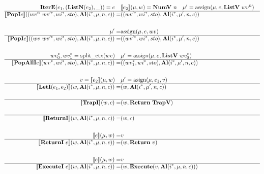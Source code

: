 \begin{align*}
%
\newline \\
  \itere(e_1, (\listniter(e_2), \_))=e \quad&
  \sem{e_2}(\mu, w) = \numv ~ n \quad
  \mu' = \text{assign}(\mu, e, \listv ~ wv^n) \\
  \hline
  \sem{\popi e}((wv^n ~ \seq{wv'}, \seq{wi}, sto), \al (\seq{i}, \mu, n, c))
  =&
  ((\seq{wv'}, \seq{wi}, sto), \al (\seq{i}, \mu', n, c)) \\
%
\newline \\
  \mu' =& \text{assign}(\mu, e, wv) \\
  \hline
  \sem{\popi e}((wv ~ \seq{wv'}, \seq{wi}, sto), \al (\seq{i}, \mu, n, c))
  =&
  ((\seq{wv'}, \seq{wi}, sto), \al (\seq{i}, \mu', n, c)) \\
%
\newline \\
  \seq{wv_0}, \seq{wv_1} = \text{split\_ctx}(wv) \quad& \mu' = \text{assign}(\mu, e, \listv ~ \seq{wv_0}) \\
  \hline
  \sem{\popalli e}(\seq{wv}, \seq{wi}, sto), \al (\seq{i}, \mu, n, c))
  =&
  ((\seq{wv_1}, \seq{wi}, sto), \al (\seq{i}, \mu', n, c)) \\
%
\newline \\
  v = \sem{e_2}(\mu, w) \quad& \mu' = \text{asign}(\mu, e_1, v) \\
  \hline
  \sem{\leti(e_1, e_2)}(w, \al (\seq{i}, \mu, n, c))
  =&
  (w, \al (\seq{i}, \mu', n, c)) \\
%
\newline \\
  \hline
  \sem{\trapi}(w, c) =& (w, \ret ~ \trapv) \\
%
\newline \\
  \hline
  \sem{\returni}(w, \al (\seq{i}, \mu, n, c)) =& (w, c) \\
%
\newline \\
  \sem{e}(\mu, w) =& v \\
  \hline
  \sem{\returni ~ e}(w, \al (\seq{i}, \mu, n, c)) =& (w, \ret ~ v) \\
%
\newline \\
  \sem{e}(\mu, w) =& v \\
  \hline
  \sem{\executei ~ e}(w, \al (\seq{i}, \mu, n, c))
  =&
  (w, \exe (v, \al (\seq{i}, \mu, n, c))) \\

\end{align*}
